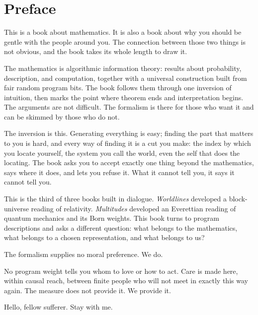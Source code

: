 \chapter*{Preface}

This is a book about mathematics. It is also a book about why you should be gentle with the people around you. The connection between those two things is not obvious, and the book takes its whole length to draw it.

The mathematics is algorithmic information theory: results about probability, description, and computation, together with a universal construction built from fair random program bits. The book follows them through one inversion of intuition, then marks the point where theorem ends and interpretation begins. The arguments are not difficult. The formalism is there for those who want it and can be skimmed by those who do not.

The inversion is this. Generating everything is easy; finding the part that matters to you is hard, and every way of finding it is a cut you make: the index by which you locate yourself, the system you call the world, even the self that does the locating. The book asks you to accept exactly one thing beyond the mathematics, says where it does, and lets you refuse it. What it cannot tell you, it says it cannot tell you.

This is the third of three books built in dialogue. \textit{Worldlines} developed a block-universe reading of relativity. \textit{Multitudes} developed an Everettian reading of quantum mechanics and its Born weights. This book turns to program descriptions and asks a different question: what belongs to the mathematics, what belongs to a chosen representation, and what belongs to us?

The formalism supplies no moral preference. We do.

No program weight tells you whom to love or how to act. Care is made here, within causal reach, between finite people who will not meet in exactly this way again. The measure does not provide it. We provide it.

Hello, fellow sufferer. Stay with me.
